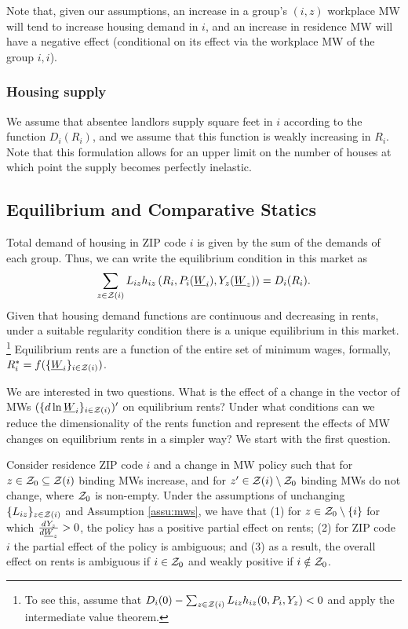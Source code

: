 Note that, given our assumptions, an increase in a group's $(i,z)$ workplace MW 
will tend to increase housing demand in $i$, and an increase in residence MW
will have a negative effect (conditional on its effect via the workplace MW
of the group $i,i$).


\subsubsection*{Housing supply}

We assume that absentee landlors supply square feet in $i$ according to the 
function $D_i(R_i)$,
and we assume that this function is weakly increasing in $R_i$.
Note that this formulation allows for an upper limit on the number of houses at 
which point the supply becomes perfectly inelastic.

\subsection{Equilibrium and Comparative Statics}

Total demand of housing in ZIP code $i$ is given by the sum of the demands of 
each group.
Thus, we can write the equilibrium condition in this market as
\begin{equation}\label{eq:equilibrium}
	\sum_{z\in\mathcal{Z}(i)} L_{iz} h_{iz} \left(R_i, P_i(\underline{W}_i), Y_z(\underline{W}_z)\right) = D_i(R_i) .
\end{equation}
Given that housing demand functions are continuous and decreasing in rents, 
under a suitable regularity condition there is a unique equilibrium in this market.%
\footnote{To see this, assume that 
$D_i(0) - \sum_{z\in\mathcal{Z}(i)} L_{iz} h_{iz} (0, P_i, Y_z) < 0$
and apply the intermediate value theorem.}
Equilibrium rents are a function of the entire set of minimum wages, formally, 
$R^*_i = f(\{\underline{W}_i\}_{i\in\mathcal{Z}(i)})$.

We are interested in two questions.
What is the effect of a change in the vector of MWs $(\{d \ln \underline{W}_i\}_{i\in\mathcal{Z}(i)})'$
on equilibrium rents?
Under what conditions can we reduce the dimensionality of the rents function and 
represent the effects of MW changes on equilibrium rents in a simpler way?
We start with the first question.

\begin{prop}\label{prop:comparative_statics}
    Consider residence ZIP code $i$ and a change in MW policy such that 
    for $z\in\mathcal{Z}_0 \subseteq \mathcal{Z}(i)$ binding MWs increase, 
    and for $z'\in\mathcal{Z}(i)\setminus \mathcal{Z}_0$ binding MWs do not change,
    where $\mathcal{Z}_0$ is non-empty.
    Under the assumptions of unchanging $\{L_{iz}\}_{z\in\mathcal{Z}(i)}$ 
    and Assumption \ref{assu:mws},
    we have that
    (1) for $z\in\mathcal{Z}_0\setminus\{i\}$ for which $\frac{d Y_z}{d \underline{W}_z}>0$, 
    the policy has a positive partial effect on rents;
    (2) for ZIP code $i$ the partial effect of the policy is ambiguous; and
    (3) as a result, the overall effect on rents is ambiguous if $i\in\mathcal{Z}_0$ 
    and weakly positive if $i\notin\mathcal{Z}_0$.
\end{prop}

